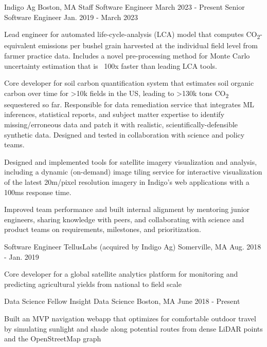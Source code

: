 \documentclass[11pt, a4paper]{awesome-cv}
\begin{document}
\begin{cventries}

  \cventrydouble
    {Indigo Ag}  %
    {Boston, MA}  %
    {Staff Software Engineer}  %
    {March 2023 - Present}  %
    {Senior Software Engineer}  %
    {Jan. 2019 - March 2023}  %
    {
    \begin{cvitems}
      \item Lead engineer for automated life-cycle-analysis (LCA) model that computes CO\textsubscript{2}-equivalent emissions per bushel grain harvested at the individual field level from farmer practice data. Includes a novel pre-processing method for Monte Carlo uncertainty estimation that is ~100x faster than leading LCA tools.
      \item Core developer for soil carbon quantification system that estimates soil organic carbon over time for >10k fields in the US, leading to >130k tons CO\textsubscript{2} sequestered so far. Responsible for data remediation service that integrates ML inferences, statistical reports, and subject matter expertise to identify missing/erroneous data and patch it with realistic, scientifically-defensible synthetic data. Designed and tested in collaboration with science and policy teams.
      \item Designed and implemented tools for satellite imagery visualization and analysis, including a dynamic (on-demand) image tiling service for interactive visualization of the latest 20m/pixel resolution imagery in Indigo’s web applications with a 100ms response time.
      \item Improved team performance and built internal alignment by mentoring junior engineers, sharing knowledge with peers, and collaborating with science and product teams on requirements, milestones, and prioritization.
    \end{cvitems}
    }

  \cventrytight
    {Software Engineer}
    {TellusLabs (acquired by Indigo Ag)}
    {Somerville, MA}
    {Aug. 2018 - Jan. 2019}
    {
    \begin{cvitems}
      \item Core developer for a global satellite analytics platform for monitoring and predicting agricultural yields from national to field scale
    \end{cvitems}
    }

  \cventrytight
    {Data Science Fellow}
    {Insight Data Science}
    {Boston, MA}
    {June 2018 - Present}
    {
    \begin{cvitems}
      \item Built an MVP navigation webapp that optimizes for comfortable outdoor travel by simulating sunlight and shade along potential routes from dense LiDAR points and the OpenStreetMap graph
    \end{cvitems}
    }


\end{cventries}
\end{document}
